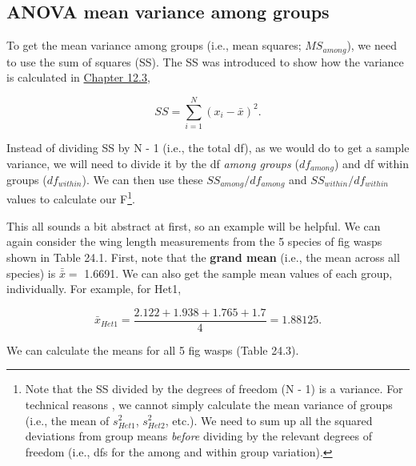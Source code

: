 \documentclass[
  openany]{krantz}
\begin{document}
\hypertarget{anova-mean-variance-among-groups}{%
\subsection{ANOVA mean variance among groups}\label{anova-mean-variance-among-groups}}

To get the mean variance among groups (i.e., mean squares; \(MS_{among}\)), we need to use the sum of squares (SS).
The SS was introduced to show how the variance is calculated in \protect\hyperlink{the-variance}{Chapter 12.3},

\[SS = \sum_{i = 1}^{N}\left(x_{i} - \bar{x} \right)^{2}.\]

Instead of dividing SS by N - 1 (i.e., the total df), as we would do to get a sample variance, we will need to divide it by the df \emph{among groups} (\(df_{among}\)) and df within groups (\(df_{within}\)).
We can then use these \(SS_{among}/df_{among}\) and \(SS_{within}/df_{within}\) values to calculate our F\footnote{Note that the SS divided by the degrees of freedom (N - 1) is a variance. For technical reasons \citep{Sokal1995}, we cannot simply calculate the mean variance of groups (i.e., the mean of \(s^{2}_{Het1}\), \(s^{2}_{Het2}\), etc.). We need to sum up all the squared deviations from group means \emph{before} dividing by the relevant degrees of freedom (i.e., dfs for the among and within group variation).}.

This all sounds a bit abstract at first, so an example will be helpful.
We can again consider the wing length measurements from the 5 species of fig wasps shown in Table 24.1.
First, note that the \textbf{grand mean} (i.e., the mean across all species) is \(\bar{\bar{x}} =\) 1.6691.
We can also get the sample mean values of each group, individually.
For example, for Het1,

\[\bar{x}_{Het1} = \frac{2.122 + 1.938 + 1.765 + 1.7}{4} = 1.88125.\]

We can calculate the means for all 5 fig wasps (Table 24.3).
\end{document}
